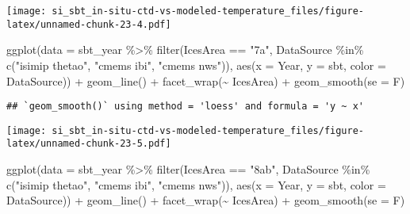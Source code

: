 \documentclass[
]{article}
\newenvironment{Shaded}{\begin{snugshade}}{\end{snugshade}}
\newcommand{\AttributeTok}[1]{\textcolor[rgb]{0.77,0.63,0.00}{#1}}
\newcommand{\FunctionTok}[1]{\textcolor[rgb]{0.00,0.00,0.00}{#1}}
\newcommand{\NormalTok}[1]{#1}
\newcommand{\SpecialCharTok}[1]{\textcolor[rgb]{0.00,0.00,0.00}{#1}}
\newcommand{\StringTok}[1]{\textcolor[rgb]{0.31,0.60,0.02}{#1}}
\begin{document}
\texttt{[image: si\_sbt\_in-situ-ctd-vs-modeled-temperature\_files/figure-latex/unnamed-chunk-23-4.pdf]}

\begin{Shaded}
\begin{Highlighting}[]
\FunctionTok{ggplot}\NormalTok{(}\AttributeTok{data =}\NormalTok{ sbt\_year }\SpecialCharTok{\%\textgreater{}\%} \FunctionTok{filter}\NormalTok{(IcesArea }\SpecialCharTok{==} \StringTok{"7a"}\NormalTok{, DataSource }\SpecialCharTok{\%in\%} \FunctionTok{c}\NormalTok{(}\StringTok{"isimip thetao"}\NormalTok{, }\StringTok{"cmems ibi"}\NormalTok{, }\StringTok{"cmems nws"}\NormalTok{)), }\FunctionTok{aes}\NormalTok{(}\AttributeTok{x =}\NormalTok{ Year, }\AttributeTok{y =}\NormalTok{ sbt, }\AttributeTok{color =}\NormalTok{ DataSource)) }\SpecialCharTok{+} \FunctionTok{geom\_line}\NormalTok{() }\SpecialCharTok{+} \FunctionTok{facet\_wrap}\NormalTok{(}\SpecialCharTok{\textasciitilde{}}\NormalTok{ IcesArea) }\SpecialCharTok{+} \FunctionTok{geom\_smooth}\NormalTok{(}\AttributeTok{se =}\NormalTok{ F)}
\end{Highlighting}
\end{Shaded}

\begin{verbatim}
## `geom_smooth()` using method = 'loess' and formula = 'y ~ x'
\end{verbatim}

\texttt{[image: si\_sbt\_in-situ-ctd-vs-modeled-temperature\_files/figure-latex/unnamed-chunk-23-5.pdf]}

\begin{Shaded}
\begin{Highlighting}[]
\FunctionTok{ggplot}\NormalTok{(}\AttributeTok{data =}\NormalTok{ sbt\_year }\SpecialCharTok{\%\textgreater{}\%} \FunctionTok{filter}\NormalTok{(IcesArea }\SpecialCharTok{==} \StringTok{"8ab"}\NormalTok{, DataSource }\SpecialCharTok{\%in\%} \FunctionTok{c}\NormalTok{(}\StringTok{"isimip thetao"}\NormalTok{, }\StringTok{"cmems ibi"}\NormalTok{, }\StringTok{"cmems nws"}\NormalTok{)), }\FunctionTok{aes}\NormalTok{(}\AttributeTok{x =}\NormalTok{ Year, }\AttributeTok{y =}\NormalTok{ sbt, }\AttributeTok{color =}\NormalTok{ DataSource)) }\SpecialCharTok{+} \FunctionTok{geom\_line}\NormalTok{() }\SpecialCharTok{+} \FunctionTok{facet\_wrap}\NormalTok{(}\SpecialCharTok{\textasciitilde{}}\NormalTok{ IcesArea) }\SpecialCharTok{+} \FunctionTok{geom\_smooth}\NormalTok{(}\AttributeTok{se =}\NormalTok{ F)}
\end{Highlighting}
\end{Shaded}
\end{document}
